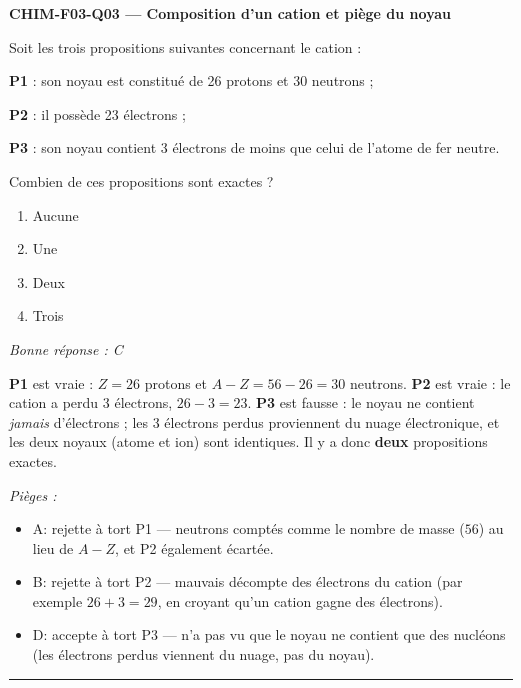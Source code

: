 \documentclass[11pt,a4paper]{article}
\begin{document}
\noindent\textbf{CHIM-F03-Q03 --- Composition d'un cation et piège du noyau}\par
Soit les trois propositions suivantes concernant le cation  :\par
\textbf{P1} : son noyau est constitué de \num{26} protons et \num{30} neutrons ;\par
\textbf{P2} : il possède \num{23} électrons ;\par
\textbf{P3} : son noyau contient \num{3} électrons de moins que celui de l'atome de fer neutre.\par
Combien de ces propositions sont exactes ?
\begin{enumerate}[label=\Alph*)]
\item Aucune
\item Une
\item Deux
\item Trois
\end{enumerate}
\textit{Bonne réponse : C}\par
\textbf{P1} est vraie : $Z=26$ protons et $A-Z = 56-26 = 30$ neutrons. \textbf{P2} est vraie : le cation a perdu \num{3} électrons, $26-3 = 23$. \textbf{P3} est fausse : le noyau ne contient \emph{jamais} d'électrons ; les \num{3} électrons perdus proviennent du nuage électronique, et les deux noyaux (atome et ion) sont identiques. Il y a donc \textbf{deux} propositions exactes.\par
\textit{Pièges :}
\begin{itemize}
\item A: rejette à tort P1 --- neutrons comptés comme le nombre de masse ($56$) au lieu de $A-Z$, et P2 également écartée.
\item B: rejette à tort P2 --- mauvais décompte des électrons du cation (par exemple $26+3=29$, en croyant qu'un cation gagne des électrons).
\item D: accepte à tort P3 --- n'a pas vu que le noyau ne contient que des nucléons (les électrons perdus viennent du nuage, pas du noyau).
\end{itemize}
\vspace{8pt}\hrule\vspace{8pt}
\end{document}
